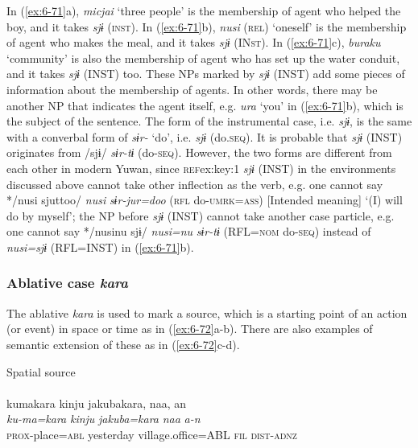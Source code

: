 \begin{table}
In (\ref{ex:6-71}a), \textit{micjai} ‘three people’ is the membership of agent who helped the boy, and it takes \textit{sjɨ} (\textsc{inst}). In (\ref{ex:6-71}b), \textit{nusi} (\textsc{rel}) ‘oneself’ is the membership of agent who makes the meal, and it takes \textit{sjɨ} (IN\textsc{st}). In (\ref{ex:6-71}c), \textit{buraku} ‘community’ is also the membership of agent who has set up the water conduit, and it takes \textit{sjɨ} (INST) too. These NPs marked by \textit{sjɨ} (INST) add some pieces of information about the membership of agents. In other words, there may be another NP that indicates the agent itself, e.g. \textit{ura} ‘you’ in (\ref{ex:6-71}b), which is the subject of the sentence. The form of the instrumental case, i.e. \textit{sjɨ}, is the same with a converbal form of \textit{sɨr-} ‘do’, i.e. \textit{sjɨ} (do.\textsc{seq}). It is probable that \textit{sjɨ} (INST) originates from /sjɨ/ \textit{sɨr-tɨ} (do-\textsc{seq}). However, the two forms are different from each other in modern Yuwan, since \textsc{ref}{ex:key:1} \textit{sjɨ} (INST) in the environments discussed above cannot take other inflection as the verb, e.g. one cannot say */nusi sjuttoo/ \textit{nusi} \textit{sɨr-jur=doo} (\textsc{rfl} do-\textsc{umrk}=\textsc{ass}) [Intended meaning] ‘(I) will do by myself’;  the NP before \textit{sjɨ} (INST) cannot take another case particle, e.g. one cannot say */nusinu sjɨ/ \textit{nusi=nu} \textit{sɨr-tɨ} (RFL=\textsc{nom} do-\textsc{seq}) instead of \textit{nusi=sjɨ} (RFL=INST) in (\ref{ex:6-71}b).

\subsubsection{ Ablative case \textit{kara}}

The ablative \textit{kara} is used to mark a source, which is a starting point of an action (or event) in space or time as in (\ref{ex:6-72}a-b). There are also examples of semantic extension of these as in (\ref{ex:6-72}c-d).

\ea\label{ex:6-72}
 Spatial source\\

 \ea{}\\
{\TM}
\glll  kumakara  kinju  jakubakara,  naa,  an\\
\textit{ku-ma=kara}  \textit{kinju}  \textit{jakuba=kara}  \textit{naa}  \textit{a-n}\\
\textsc{prox}-place=\textsc{abl}  yesterday  village.office=ABL  \textsc{fil}  \textsc{dist}-\textsc{adnz}


\end{table}
